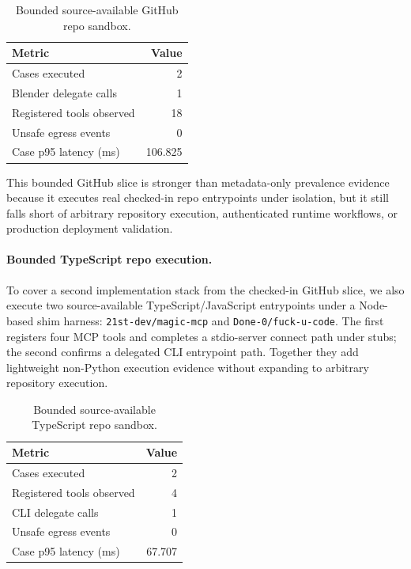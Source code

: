 \documentclass[10pt]{article}
\begin{document}
\begin{table}[t]
\centering
\caption{Bounded source-available GitHub repo sandbox.}
\label{tab:github_repo_sandbox}
\begin{tabular}{lr}
\toprule
Metric & Value \\
\midrule
Cases executed & 2 \\
Blender delegate calls & 1 \\
Registered tools observed & 18 \\
Unsafe egress events & 0 \\
Case p95 latency (ms) & 106.825 \\
\bottomrule
\end{tabular}
\end{table}

This bounded GitHub slice is stronger than metadata-only prevalence evidence because it executes real checked-in repo entrypoints under isolation, but it still falls short of arbitrary repository execution, authenticated runtime workflows, or production deployment validation.

\paragraph{Bounded TypeScript repo execution.}
To cover a second implementation stack from the checked-in GitHub slice, we also execute two source-available TypeScript/JavaScript entrypoints under a Node-based shim harness: \texttt{21st-dev/magic-mcp} and \texttt{Done-0/fuck-u-code}. The first registers four MCP tools and completes a stdio-server connect path under stubs; the second confirms a delegated CLI entrypoint path. Together they add lightweight non-Python execution evidence without expanding to arbitrary repository execution.

\begin{table}[t]
\centering
\caption{Bounded source-available TypeScript repo sandbox.}
\label{tab:typescript_repo_sandbox}
\begin{tabular}{lr}
\toprule
Metric & Value \\
\midrule
Cases executed & 2 \\
Registered tools observed & 4 \\
CLI delegate calls & 1 \\
Unsafe egress events & 0 \\
Case p95 latency (ms) & 67.707 \\
\bottomrule
\end{tabular}
\end{table}
\end{document}
